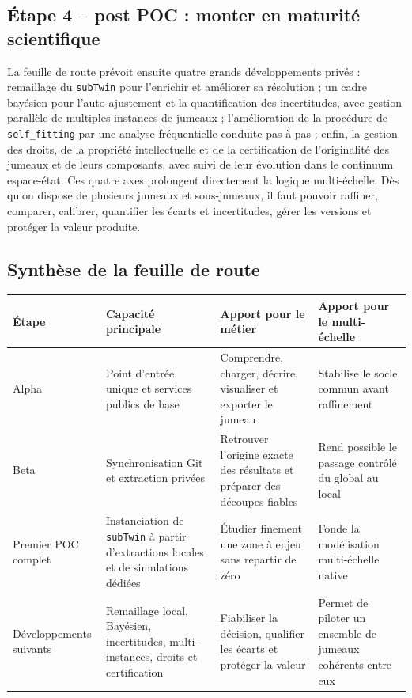 \documentclass[11pt,a4paper]{article}
\newcommand{\subt}{\texttt{subTwin}}
\begin{document}
\subsection{Étape 4 -- post POC : monter en maturité scientifique}

La feuille de route prévoit ensuite quatre grands développements privés : remaillage du \subt{} pour l'enrichir et améliorer sa résolution ; un cadre bayésien pour l'auto-ajustement et la quantification des incertitudes, avec gestion parallèle de multiples instances de jumeaux ; l'amélioration de la procédure de \texttt{self\_fitting} par une analyse fréquentielle conduite pas à pas ; enfin, la gestion des droits, de la propriété intellectuelle et de la certification de l'originalité des jumeaux et de leurs composants, avec suivi de leur évolution dans le continuum espace-état. Ces quatre axes prolongent directement la logique multi-échelle. Dès qu'on dispose de plusieurs jumeaux et sous-jumeaux, il faut pouvoir raffiner, comparer, calibrer, quantifier les écarts et incertitudes, gérer les versions et protéger la valeur produite.


\subsection{Synthèse de la feuille de route}

\begin{longtable}{>{\raggedright\arraybackslash}p{} >{\raggedright\arraybackslash}p{} >{\raggedright\arraybackslash}p{} >{\raggedright\arraybackslash}p{}}
\toprule
\textbf{Étape} & \textbf{Capacité principale} & \textbf{Apport pour le métier} & \textbf{Apport pour le multi-échelle} \\
\midrule
Alpha & Point d'entrée unique et services publics de base & Comprendre, charger, décrire, visualiser et exporter le jumeau & Stabilise le socle commun avant raffinement \\
Beta & Synchronisation Git et extraction privées & Retrouver l'origine exacte des résultats et préparer des découpes fiables & Rend possible le passage contrôlé du global au local \\
Premier POC complet & Instanciation de \subt{} à partir d'extractions locales et de simulations dédiées & Étudier finement une zone à enjeu sans repartir de zéro & Fonde la modélisation multi-échelle native \\
Développements suivants & Remaillage local, Bayésien, incertitudes, multi-instances, droits et certification & Fiabiliser la décision, qualifier les écarts et protéger la valeur & Permet de piloter un ensemble de jumeaux cohérents entre eux \\
\bottomrule
\end{longtable}
\end{document}
